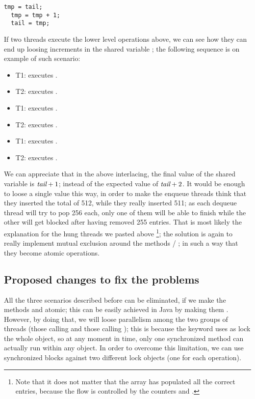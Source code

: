 \begin{lstlisting}[style=nonumbers]
  tmp = tail;
  tmp = tmp + 1;
  tail = tmp;
\end{lstlisting} 
\hfill

If two threads execute the lower level operations above, we can see
how they can end up loosing increments in the shared variable
; the following sequence is on example of such scenario:

\begin{itemize}
\item T1: executes .
\item T2: executes .
\item T1: executes .
\item T2: executes .
\item T1: executes .
\item T2: executes .
\end{itemize}
\hfill

We can appreciate that in the above interlacing, the final value of
the shared variable is $\emph{tail} + 1$; instead of the expected value
of $\emph{tail} + 2$. It would be enough to loose a single value this
way, in order to make the enqueue threads think that they inserted the
total of 512, while they really inserted 511; as each dequeue thread
will try to pop 256 each, only one of them will be able to finish
while the other will get blocked after having removed 255
entries. That is most likely the explanation for the hung threads we
pasted above \footnote{Note that it does not matter that the array
   has populated all the correct entries, because the flow is
  controlled by the counters  and .}; the solution is
again to really implement mutual 
exclusion around the methods  / ; in such a way that
they become atomic operations.

\subsection{Proposed changes to fix the problems}

All the three scenarios described before can be eliminated, if we make
the methods  and  atomic; this can be easily achieved in
Java by making them . However, by doing that, we will
loose parallelism among the two groups of threads (those calling
 and those calling ); this is because the
 keyword uses as lock the whole object, so at any
moment in time, only one synchronized method can actually run within any object. In
order to overcome this limitation, we can use synchronized blocks
against two different lock objects (one for each operation). \\

